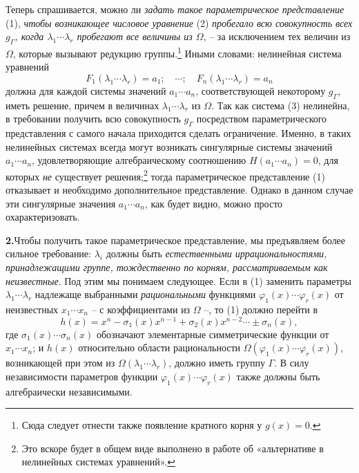 \documentclass[11pt]{article}
\begin{document}
Теперь спрашивается, можно ли \emph{задать такое параметрическое представление} (1), \emph{чтобы возникающее числовое уравнение} (2) \emph{пробегало всю совокупность всех $g_\Gamma$, когда $\lambda_1\cdots\lambda_r$ пробегают все величины из $\Omega$}, -- за исключением тех величин из $\Omega$, которые вызывают редукцию группы.\footnote{Сюда следует отнести также появление кратного корня у $g(x)=0$.} Иными словами: нелинейная система уравнений
\begin{equation}
 F_1(\lambda_1\cdots\lambda_r)=a_1;\quad \cdots;\quad F_n(\lambda_1\cdots\lambda_r)=a_n
\tag{3}
\end{equation}
должна для каждой системы значений $a_1\cdots a_n$, соответствующей некоторому $g_\Gamma$, иметь решение, причем в величинах $\lambda_1\cdots\lambda_r$ из $\Omega$. Так как система (3) нелинейна, в требовании получить всю совокупность $g_\Gamma$ посредством параметрического представления с самого начала приходится сделать ограничение. Именно, в таких нелинейных системах всегда могут возникать сингулярные системы значений $a_1\cdots a_n$, удовлетворяющие алгебраическому соотношению $H(a_1\cdots a_n)=0$, для которых \emph{не} существует решения;\footnote{Это вскоре будет в общем виде выполнено в работе об «альтернативе в нелинейных системах уравнений».} тогда параметрическое представление (1) отказывает и необходимо дополнительное представление. Однако в данном случае эти сингулярные значения $a_1\cdots a_n$, как будет видно, можно просто охарактеризовать.

\noindent\textbf{2.}\quad Чтобы получить такое параметрическое представление, мы предъявляем более сильное требование: $\lambda_i$ должны быть \emph{естественными иррациональностями, принадлежащими группе, тождественно по корням, рассматриваемым как неизвестные}. Под этим мы понимаем следующее. Если в (1) заменить параметры $\lambda_1\cdots\lambda_r$ надлежаще выбранными \emph{рациональными} функциями $\varphi_1(x)\cdots\varphi_r(x)$ от неизвестных $x_1\cdots x_n$ -- с коэффициентами из $\Omega$ --, то (1) должно перейти в
\begin{equation}
 h(x)=x^n-\sigma_1(x)x^{n-1}+\sigma_2(x)x^{n-2}\cdots\pm\sigma_n(x),
\tag{4}
\end{equation}
где $\sigma_1(x)\cdots\sigma_n(x)$ обозначают элементарные симметрические функции от $x_1\cdots x_n$; и $h(x)$ относительно области рациональности $\Omega(\varphi_1(x)\cdots\varphi_r(x))$, возникающей при этом из $\Omega(\lambda_1\cdots\lambda_r)$, должно иметь группу $\Gamma$. В силу независимости параметров функции $\varphi_1(x)\cdots\varphi_r(x)$ также должны быть алгебраически независимыми.
\end{document}
